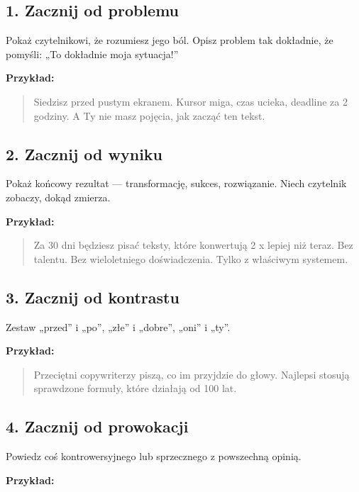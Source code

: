 \documentclass[
  12pt,
  a4paper,
  twoside,
  openright,
  12pt,
  DIV=12,
  BCOR=12mm]{scrbook}
\begin{document}
\subsection{1. Zacznij od problemu}\label{zacznij-od-problemu}

Pokaż czytelnikowi, że rozumiesz jego ból. Opisz problem tak dokładnie,
że pomyśli: „To dokładnie moja sytuacja!''

\textbf{Przykład:}

\begin{quote}
Siedzisz przed pustym ekranem. Kursor miga, czas ucieka, deadline za 2
godziny. A Ty nie masz pojęcia, jak zacząć ten tekst.
\end{quote}

\subsection{2. Zacznij od wyniku}\label{zacznij-od-wyniku}

Pokaż końcowy rezultat --- transformację, sukces, rozwiązanie. Niech
czytelnik zobaczy, dokąd zmierza.

\textbf{Przykład:}

\begin{quote}
Za 30 dni będziesz pisać teksty, które konwertują 2 x lepiej niż teraz.
Bez talentu. Bez wieloletniego doświadczenia. Tylko z właściwym
systemem.
\end{quote}

\subsection{3. Zacznij od kontrastu}\label{zacznij-od-kontrastu}

Zestaw „przed'' i „po'', „złe'' i „dobre'', „oni'' i „ty''.

\textbf{Przykład:}

\begin{quote}
Przeciętni copywriterzy piszą, co im przyjdzie do głowy. Najlepsi
stosują sprawdzone formuły, które działają od 100 lat.
\end{quote}

\subsection{4. Zacznij od prowokacji}\label{zacznij-od-prowokacji}

Powiedz coś kontrowersyjnego lub sprzecznego z powszechną opinią.

\textbf{Przykład:}
\end{document}
